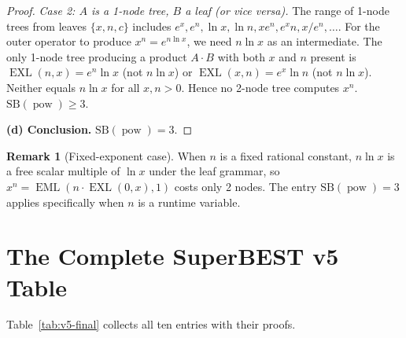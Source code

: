 \documentclass[12pt,a4paper]{article}
\theoremstyle{definition}
\newtheorem{remark}[theorem]{Remark}
\newcommand{\EML}{\operatorname{EML}}
\newcommand{\EXL}{\operatorname{EXL}}
\newcommand{\powop}{\operatorname{pow}}
\newcommand{\SB}{\mathrm{SB}}
\begin{document}
\begin{proof}
\emph{Case 2: $A$ is a 1-node tree, $B$ a leaf (or vice versa).}
The range of 1-node trees from leaves $\{x,n,c\}$ includes
$e^x, e^n, \ln x, \ln n, xe^n, e^x n, x/e^n, \ldots$.
For the outer operator to produce $x^n = e^{n\ln x}$, we need $n\ln x$ as an
intermediate.  The only 1-node tree producing a product $A \cdot B$ with both
$x$ and $n$ present is $\EXL(n,x) = e^n \ln x$ (not $n \ln x$)
or $\EXL(x,n) = e^x \ln n$ (not $n\ln x$).
Neither equals $n\ln x$ for all $x, n > 0$.
Hence no 2-node tree computes $x^n$.  $\SB(\powop) \ge 3$.

\textbf{(d) Conclusion.} $\SB(\powop) = 3$.
\end{proof}

\begin{remark}[Fixed-exponent case]
When $n$ is a fixed rational constant, $n\ln x$ is a free scalar multiple of $\ln x$
under the leaf grammar, so $x^n = \EML(n \cdot \EXL(0,x), 1)$ costs only 2 nodes.
The entry $\SB(\powop) = 3$ applies specifically when $n$ is a runtime variable.
\end{remark}

\section{The Complete SuperBEST v5 Table}
\label{sec:complete-table}

Table~\ref{tab:v5-final} collects all ten entries with their proofs.
\end{document}
